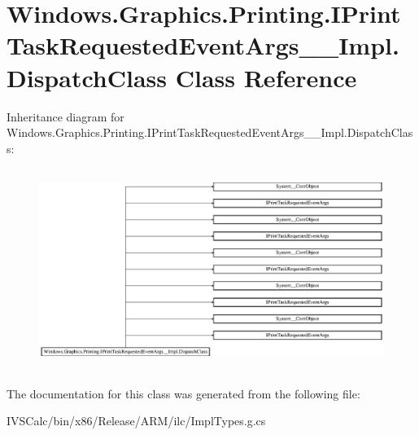 \hypertarget{class_windows_1_1_graphics_1_1_printing_1_1_i_print_task_requested_event_args_____impl_1_1_dispatch_class}{}\section{Windows.\+Graphics.\+Printing.\+I\+Print\+Task\+Requested\+Event\+Args\+\_\+\+\_\+\+Impl.\+Dispatch\+Class Class Reference}
\label{class_windows_1_1_graphics_1_1_printing_1_1_i_print_task_requested_event_args_____impl_1_1_dispatch_class}
Inheritance diagram for Windows.\+Graphics.\+Printing.\+I\+Print\+Task\+Requested\+Event\+Args\+\_\+\+\_\+\+Impl.\+Dispatch\+Class\+:\begin{figure}[H]
\begin{center}
\leavevmode
\includegraphics[height=6.581197cm]{class_windows_1_1_graphics_1_1_printing_1_1_i_print_task_requested_event_args_____impl_1_1_dispatch_class}
\end{center}
\end{figure}


The documentation for this class was generated from the following file\+:\begin{DoxyCompactItemize}
\item 
I\+V\+S\+Calc/bin/x86/\+Release/\+A\+R\+M/ilc/Impl\+Types.\+g.\+cs\end{DoxyCompactItemize}
